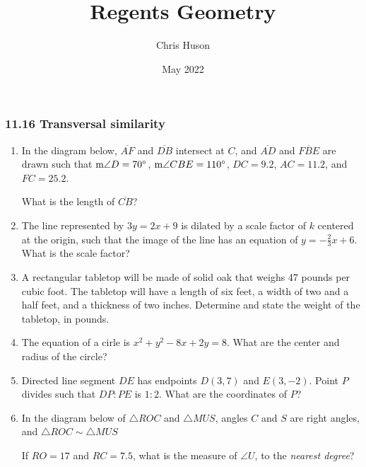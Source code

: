 \documentclass[12pt, oneside]{article}
\title{Regents Geometry}
\author{Chris Huson}
\date{May 2022}
\begin{document}
\subsubsection*{11.16 Transversal similarity}
\begin{enumerate}[itemsep=1.1cm]
\item In the diagram below, $\overline{AF}$ and $\overline{DB}$ intersect at $C$, and $\overline{AD}$ and $\overline{FBE}$ are drawn such that $\textup{m}\angle D = 70^\circ$, $\textup{m}\angle CBE = 110^\circ$, $DC=9.2$, $AC=11.2$, and $FC=25.2$.
  \begin{center}
  \end{center}
  What is the length of $\overline{CB}$?

\item The line represented by $3y=2x+9$ is dilated by a scale factor of $k$ centered at the origin, such that the image of the line has an equation of $y= - \frac{2}{3}x+6$. What is the scale factor?

\item A rectangular tabletop will be made of solid oak that weighs 47 pounds per cubic foot. The tabletop will have a length of six feet, a width of two and a half feet, and a thickness of two inches. Determine and state the weight of the tabletop, in pounds.

\item The equation of a cirle is $x^2+y^2-8x+2y=8$. What are the center and radius of the circle?

\item Directed line segment $DE$ has endpoints $D(3, 7)$ and $E(3,-2)$. Point $P$ divides such that $DP:PE$ is $1:2$. What are the coordinates of $P$?

\newpage
\item In the diagram below of $\triangle ROC$ and $\triangle MUS$, angles $C$ and $S$ are right angles, and $\triangle ROC \sim \triangle MUS$
\begin{center}
\end{center}
If $RO=17$ and $RC=7.5$, what is the measure of $\angle U$, to the \emph{nearest degree}?


\end{enumerate}
\end{document}

